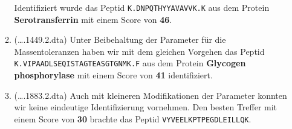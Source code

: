\documentclass{homework}
\begin{document}
\begin{enumerate}
\begin{enumerate}
Identifiziert wurde das Peptid \texttt{K.DNPQTHYYAVAVVK.K} aus dem Protein \textbf{Serotransferrin} mit einem Score von \textbf{46}.
\item (\ldots.1449.2.dta)
Unter Beibehaltung der Parameter für die Massentoleranzen haben wir mit dem gleichen Vorgehen das Peptid
\texttt{K.VIPAADLSEQISTAGTEASGTGNMK.F} aus dem Protein \textbf{Glycogen phosphorylase} mit einem Score von \textbf{41} identifiziert.
\item (\ldots.1883.2.dta)
Auch mit kleineren Modifikationen der Parameter konnten wir keine eindeutige Identifizierung vornehmen.
Den besten Treffer mit einem Score von \textbf{30} brachte das Peptid \texttt{VYVEELKPTPEGDLEILLQK}.
\end{enumerate}


\end{enumerate}
\end{document}
